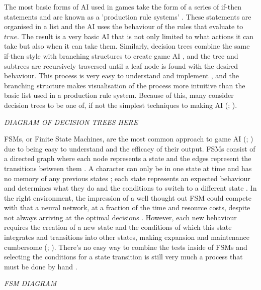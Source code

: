 \documentclass[11pt, a4paper]{article}
\begin{document}
The most basic forms of AI used in games take the form of a series of if-then statements and are known as a 'production rule systems' \parencite{tozour2002evolution}. These statements are organised in a list and the AI uses the behaviour of the rules that evaluate to $true$. The result is a very basic AI that is not only limited to what actions it can take but also when it can take them. Similarly, decision trees combine the same if-then style with branching structures to create game AI \parencite[62]{nareyek2004ai}, and the tree and subtrees are recursively traversed until a leaf node is found with the desired behaviour. This process is very easy to understand and implement \parencite[295]{millington2019ai}, and the branching structure makes visualisation of the process more intuitive than the basic list used in a production rule system. Because of this, many consider decision trees to be one of, if not the simplest techniques to making AI  (\cite[295]{millington2019ai}; \cite[7]{tozour2002evolution}).

\emph{DIAGRAM OF DECISION TREES HERE}

FSMs, or Finite State Machines, are the most common approach to game AI (\cite[1]{orkin2006three}; \cite[309]{millington2019ai}) due to being easy to understand and the efficacy of their output. FSMs consist of a directed graph where each node represents a state and the edges represent the transitions between them \parencite[6]{tozour2002evolution}. A character can only be in one state at time and has no memory of any previous states \parencite{colledanchise2014performance}; each state represents an expected behaviour and determines what they do and the conditions to switch to a different state \parencite[3]{diller2004behavior}. In the right environment, the impression of a well thought out FSM could compete with that a neural network, at a fraction of the time and resource costs, despite not always arriving at the optimal decisions \parencite{sweetser2002current}. However, each new behaviour requires the creation of a new state and the conditions of which this state integrates and transitions into other states, making expansion and maintenance cumbersome (\cite[2]{sweetser2002current}; \cite[3]{lim2010evolving}). There's no easy way to combine the tests inside of FSMs and selecting the conditions for a state transition is still very much a process that must be done by hand \parencite[313]{millington2019ai}. 

\emph{FSM DIAGRAM}
\end{document}
